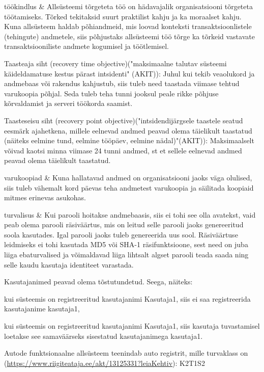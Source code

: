 \begin{longtabu}
	töökindlus 
	& Allsüsteemi tõrgeteta töö on hädavajalik organisatsiooni tõrgeteta töötamiseks. Tõrked tekitaksid suurt praktilist kahju ja ka moraalset kahju. Kuna allsüsteem haldab põhiandmeid, mis loovad konteksti transaktsioonlistele (tehingute) andmetele, siis põhjustaks allsüsteemi töö tõrge ka tõrkeid vastavate transaktsiooniliste andmete kogumisel ja töötlemisel. \linebreak \par
	Taasteaja siht (recovery time objective)("maksimaalne talutav süsteemi käideldamatuse kestus pärast intsidenti" (AKIT)): Juhul kui tekib veaolukord ja andmebaas või rakendus kahjustub, siis tuleb need taastada viimase tehtud varukoopia põhjal. Seda tuleb teha tunni jooksul peale rikke põhjuse kõrvaldamist ja serveri töökorda saamist. \linebreak \par
	Taasteseisu siht (recovery point objective)("intsidendijärgsele taastele seatud eesmärk ajahetkena, millele eelnevad andmed peavad olema täielikult taastatud (näiteks eelmine tund, eelmine tööpäev, eelmine nädal)"(AKIT)): Maksimaalselt võivad kaotsi minna viimase 24 tunni andmed, st et sellele eelnevad andmed peavad olema täielikult taastatud.	  \\ \hline
	
	
	varukoopiad 
	& Kuna hallatavad andmed on organisatsiooni jaoks väga olulised, siis tuleb vähemalt kord päevas teha andmetest varukoopia ja säilitada koopiaid mitmes erinevas asukohas.
	  \\ \hline
	
	turvalisus 
	& Kui parooli hoitakse andmebaasis, siis ei tohi see olla avatekst, vaid peab olema parooli räsiväärtus, mis on leitud selle parooli jaoks genereeritud soola kasutades. Igal parooli jaoks tuleb genereerida uus sool. Räsiväärtuse leidmiseks ei tohi kasutada MD5 või SHA-1 räsifunktsioone, sest need on juba liiga ebaturvalised ja võimaldavad liiga lihtsalt algset parooli teada saada ning selle kaudu kasutaja identiteet varastada. \linebreak \par
	Kasutajanimed peavad olema tõstutundetud. Seega, näiteks:
	\begin{myitemize}
		\item kui süsteemis on registreeritud kasutajanimi Kasutaja1, siis ei saa registreerida kasutajanime kasutaja1,
		\item kui süsteemis on registreeritud kasutajanimi Kasutaja1, siis kasutaja tuvastamisel loetakse see samaväärseks sisestatud kasutajanimega kasutaja1.
	\end{myitemize}
	Autode funktsionaalne allsüsteem teenindab auto registrit, mille turvaklass on (\url{https://www.riigiteataja.ee/akt/13125331?leiaKehtiv}): \linebreak
	K2T1S2 \linebreak \par
	

\end{longtabu}
